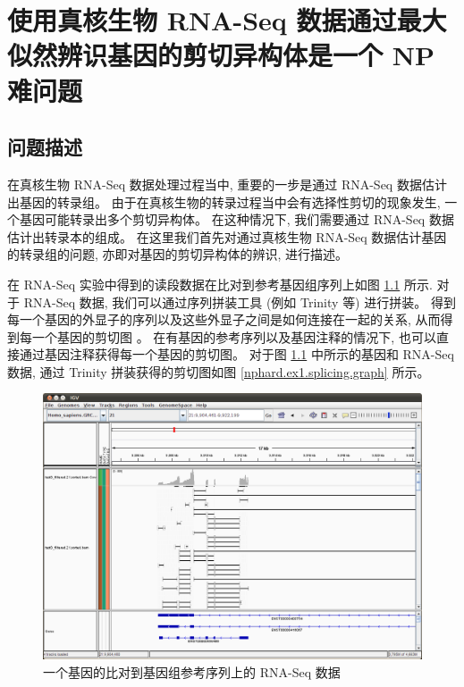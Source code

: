 \chapter{使用真核生物 RNA-Seq 数据通过最大似然辨识基因的剪切异构体是一个 NP 难问题}
\label{chap-rna-seq-nphard}

\section{问题描述}
在真核生物 RNA-Seq 数据处理过程当中, 重要的一步是通过 RNA-Seq 数据估计出基因的转录组。 
由于在真核生物的转录过程当中会有选择性剪切的现象发生, 一个基因可能转录出多个剪切异构体。 
在这种情况下, 我们需要通过 RNA-Seq 数据估计出转录本的组成。 
在这里我们首先对通过真核生物 RNA-Seq 数据估计基因的转录组的问题, 
亦即对基因的剪切异构体的辨识, 进行描述。 

在 RNA-Seq 实验中得到的读段数据在比对到参考基因组序列上如图 \ref{nphard.ex1.aligned.data} 所示. 
对于 RNA-Seq 数据, 
我们可以通过序列拼装工具 (例如 Trinity \cite{grabherr2011full} 等) 进行拼装。 
得到每一个基因的外显子的序列以及这些外显子之间是如何连接在一起的关系, 
从而得到每一个基因的剪切图 \cite{Heber01072002}。 
在有基因的参考序列以及基因注释的情况下, 也可以直接通过基因注释获得每一个基因的剪切图。 
对于图 \ref{nphard.ex1.aligned.data} 中所示的基因和 RNA-Seq 数据, 
通过 Trinity 拼装获得的剪切图如图 \ref{nphard.ex1.splicing.graph} 所示。 

\begin{figure}[!t]
\centering
\includegraphics[width=\textwidth]{figures/nphard/comp1.png}
\caption{一个基因的比对到基因组参考序列上的 RNA-Seq 数据}
\label{nphard.ex1.aligned.data}
\end{figure}


